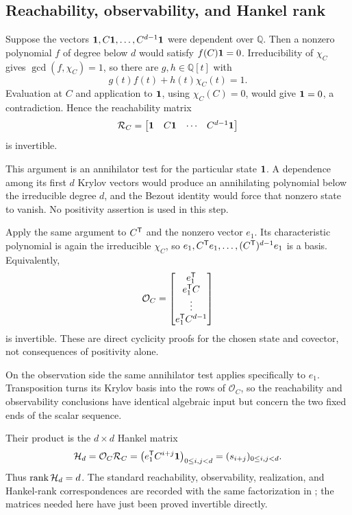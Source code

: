 \documentclass[11pt,letterpaper]{article}
\theoremstyle{plain}
\begin{document}
\subsection{Reachability, observability, and Hankel rank}

Suppose the vectors $\mathbf{1},C\mathbf{1},\ldots,C^{d-1}\mathbf{1}$ were dependent over $\mathbb Q$.  Then a nonzero polynomial $f$ of degree below $d$ would satisfy $f(C)\mathbf{1}=0$.  Irreducibility of $\chi_C$ gives $\gcd(f,\chi_C)=1$, so there are $g,h\in\mathbb Q[t]$ with
\[
g(t)f(t)+h(t)\chi_C(t)=1.
\]
Evaluation at $C$ and application to $\mathbf{1}$, using $\chi_C(C)=0$, would give $\mathbf{1}=0$, a contradiction.  Hence the reachability matrix
\[
\mathcal R_C=\begin{bmatrix}\mathbf{1}&C\mathbf{1}&\cdots&C^{d-1}\mathbf{1}\end{bmatrix}
\]
is invertible.

This argument is an annihilator test for the particular state $\mathbf{1}$.  A dependence among its first $d$ Krylov vectors would produce an annihilating polynomial below the irreducible degree $d$, and the Bezout identity would force that nonzero state to vanish.  No positivity assertion is used in this step.

Apply the same argument to $C^{\mathsf{T}}$ and the nonzero vector $e_1$.  Its characteristic polynomial is again the irreducible $\chi_C$, so $e_1,C^{\mathsf{T}}e_1,\ldots,(C^{\mathsf{T}})^{d-1}e_1$ is a basis.  Equivalently,
\[
\mathcal O_C=
\begin{bmatrix}
e_1^{\mathsf{T}}\\ e_1^{\mathsf{T}}C\\ \vdots\\ e_1^{\mathsf{T}}C^{d-1}
\end{bmatrix}
\]
is invertible.  These are direct cyclicity proofs for the chosen state and covector, not consequences of positivity alone.

On the observation side the same annihilator test applies specifically to $e_1$.  Transposition turns its Krylov basis into the rows of $\mathcal O_C$, so the reachability and observability conclusions have identical algebraic input but concern the two fixed ends of the scalar sequence.

Their product is the $d\times d$ Hankel matrix
\[
\mathcal H_d=\mathcal O_C\mathcal R_C
=\bigl(e_1^{\mathsf{T}}C^{i+j}\mathbf{1}\bigr)_{0\leq i,j<d}
=(s_{i+j})_{0\leq i,j<d}.
\]
Thus $\operatorname{rank}\mathcal H_d=d$.  The standard reachability, observability, realization, and Hankel-rank correspondences are recorded with the same factorization in \cite[Sections 2.2--2.4, 5.1, and 6.5]{StdKailath1980LinearSystems}; the matrices needed here have just been proved invertible directly.
\end{document}
